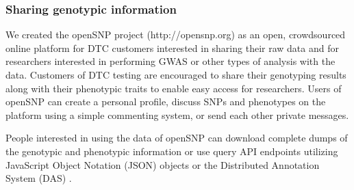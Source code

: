 \documentclass[10pt]{article}
\begin{document}
%
%
%

\subsubsection*{Sharing genotypic information}

We created the openSNP project (http://opensnp.org) as an open, crowdsourced online platform for DTC customers interested in sharing their raw data and for researchers interested in performing GWAS or other types of analysis with the data. 
Customers of DTC testing are encouraged to share their genotyping results along with their phenotypic traits to enable easy access for researchers.
Users of openSNP can create a personal profile, discuss SNPs and phenotypes on the platform using a simple commenting system, or send each other private messages.

People interested in using the data of openSNP can download complete dumps of the genotypic and phenotypic information or use query API endpoints utilizing JavaScript Object Notation (JSON) objects or the Distributed Annotation System (DAS) \cite{Dowell2001}. 
\end{document}
